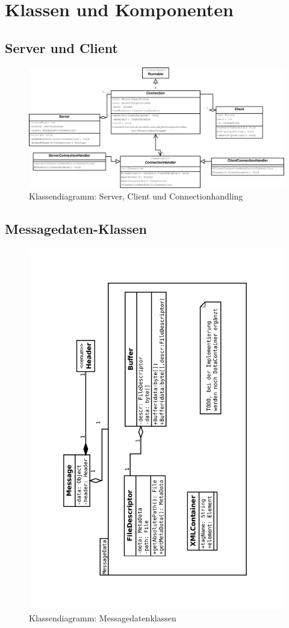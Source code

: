\section{Klassen und Komponenten}

\subsection{Server und Client}
\liable{\eddy}
\begin{figure}[H]
	\centering
	\label{dia:design:frontend:classes:svcl}
	\includegraphics[width=\textwidth]{design/frontend/classes/Server-Client-Klassen.pdf}
	\caption{Klassendiagramm: Server, Client und Connectionhandling}
\end{figure}

\subsection{Messagedaten-Klassen}
\liable{\eddy}

\begin{figure}[H]
	\centering
	\label{dia:design:frontend:classes:datcl}
	\includegraphics[angle=270, width=.8\textwidth]{design/frontend/classes/MessageDaten-Klassen.pdf}
	\caption{Klassendiagramm: Messagedatenklassen}
\end{figure}


